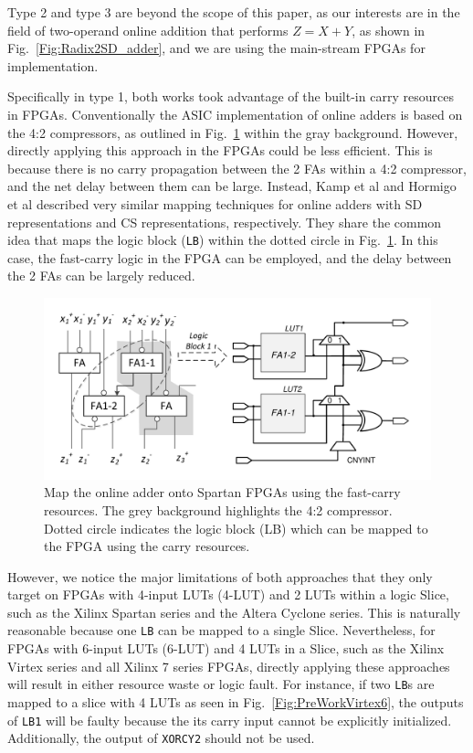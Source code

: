 \documentclass[conference]{IEEEtran}
\begin{document}
Type 2 and type 3 are beyond the scope of this paper, as our interests are in the field of two-operand online addition that performs $Z=X+Y$, as shown in Fig.~\ref{Fig:Radix2SD_adder}, and we are using the main-stream FPGAs for implementation.

Specifically in type 1, both works took advantage of the built-in carry resources in FPGAs. Conventionally the ASIC implementation of online adders is based on the 4:2 compressors, as outlined in Fig.~\ref{Fig:PreviousWork} within the gray background. However, directly applying this approach in the FPGAs could be less efficient. This is because there is no carry propagation between the 2 FAs within a 4:2 compressor, and the net delay between them can be large. Instead, Kamp et al \cite{FPT09RA} and Hormigo et al \cite{ASAP09RA} described very similar mapping techniques for online adders with SD representations and CS representations, respectively. They share the common idea that maps the logic block (\texttt{LB}) within the dotted circle in Fig.~\ref{Fig:PreviousWork}. In this case, the fast-carry logic in the FPGA can be employed, and the delay between the 2 FAs can be largely reduced.

\begin{figure}[tbp]
	\centering
	\includegraphics[width=.5\textwidth]{./Figures/SDAdder_42comp_Spartan.pdf}
	\caption{Map the online adder onto Spartan FPGAs using the fast-carry resources. The grey background highlights the 4:2 compressor. Dotted circle indicates the logic block (LB) which can be mapped to the FPGA using the carry resources.}
	\label{Fig:PreviousWork}
\end{figure}

However, we notice the major limitations of both approaches that they only target on FPGAs with 4-input LUTs (4-LUT) and 2 LUTs within a logic Slice, such as the Xilinx Spartan series and the Altera Cyclone series. This is naturally reasonable because one \texttt{LB} can be mapped to a single Slice. Nevertheless, for FPGAs with 6-input LUTs (6-LUT) and 4 LUTs in a Slice, such as the Xilinx Virtex series and all Xilinx 7 series FPGAs, directly applying these approaches will result in either resource waste or logic fault. For instance, if two \texttt{LB}s are mapped to a slice with 4 LUTs as seen in Fig.~\ref{Fig:PreWorkVirtex6}, the outputs of \texttt{LB1} will be faulty because the its carry input cannot be explicitly initialized. Additionally, the output of \texttt{XORCY2} should not be used.
\end{document}
